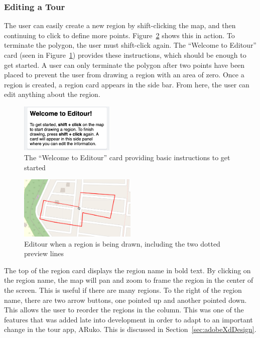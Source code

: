 \documentclass[a4paper, 10pt, american, titlepage]{article}
\begin{document}
\subsubsection{Editing a Tour}
\label{sec:editingATour}

The user can easily create a new region by shift-clicking the map, and then
continuing to click to define more points. Figure~\ref{fig:drawingRegion} shows
this in action. To terminate the polygon, the user must shift-click again. The
``Welcome to Editour'' card (seen in Figure~\ref{fig:welcomeCard}) provides
these instructions, which should be enough to get started. A user can only
terminate the polygon after two points have been placed to prevent the user
from drawing a region with an area of zero. Once a region is created, a region
card appears in the side bar. From here, the user can edit anything about the
region.

\begin{figure}[h]
	\centering
	\includegraphics[width=0.4\textwidth]{welcome-card-editour.png}
    \caption{The ``Welcome to Editour'' card providing basic instructions to
    get started}
	\label{fig:welcomeCard}
\end{figure}

\begin{figure}[h]
	\centering
	\includegraphics[width=0.5\textwidth]{drawing-region-editour.png}
	\caption{Editour when a region is being drawn, including the two dotted
		preview lines}
	\label{fig:drawingRegion}
\end{figure}

The top of the region card displays the region name in bold text. By clicking
on the region name, the map will pan and zoom to frame the region in the center
of the screen. This is useful if there are many regions. To the right of the
region name, there are two arrow buttons, one pointed up and another pointed
down. This allows the user to reorder the regions in the column. This was one
of the features that was added late into development in order to adapt to an
important change in the tour app, ARuko. This is discussed in
Section~\ref{sec:adobeXdDesign}.
\end{document}
